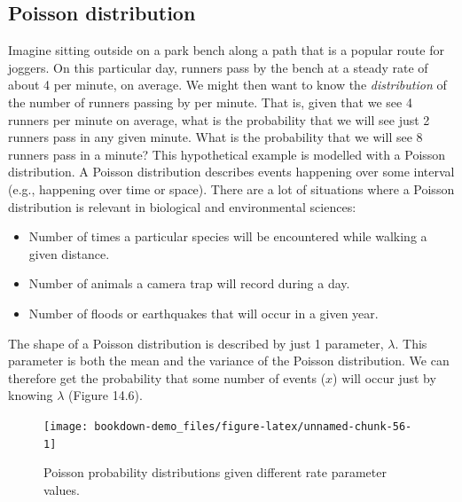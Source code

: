 \documentclass[
]{scrbook}
\providecommand{\tightlist}{%
  \setlength{\itemsep}{0pt}\setlength{\parskip}{0pt}}
\begin{document}
\hypertarget{poisson-distribution}{%
\subsection{Poisson distribution}\label{poisson-distribution}}

Imagine sitting outside on a park bench along a path that is a popular route for joggers.
On this particular day, runners pass by the bench at a steady rate of about 4 per minute, on average.
We might then want to know the \emph{distribution} of the number of runners passing by per minute.
That is, given that we see 4 runners per minute on average, what is the probability that we will see just 2 runners pass in any given minute.
What is the probability that we will see 8 runners pass in a minute?
This hypothetical example is modelled with a Poisson distribution.
A Poisson distribution describes events happening over some interval (e.g., happening over time or space).
There are a lot of situations where a Poisson distribution is relevant in biological and environmental sciences:

\begin{itemize}
\tightlist
\item
  Number of times a particular species will be encountered while walking a given distance.
\item
  Number of animals a camera trap will record during a day.
\item
  Number of floods or earthquakes that will occur in a given year.
\end{itemize}

The shape of a Poisson distribution is described by just 1 parameter, \(\lambda\).
This parameter is both the mean and the variance of the Poisson distribution.
We can therefore get the probability that some number of events (\(x\)) will occur just by knowing \(\lambda\) (Figure 14.6).

\begin{figure}
\texttt{[image: bookdown-demo\_files/figure-latex/unnamed-chunk-56-1]} \caption{Poisson probability distributions given different rate parameter values.}\label{fig:unnamed-chunk-56}
\end{figure}
\end{document}
